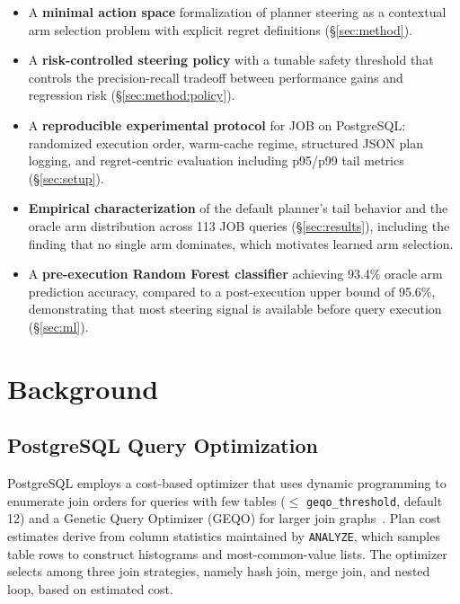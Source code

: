 \documentclass[sigconf,natbib=false]{article}
\newcommand{\postgres}{PostgreSQL}
\begin{document}
\begin{itemize}[noitemsep,topsep=2pt,leftmargin=*]
  \item A \textbf{minimal action space} formalization of planner steering as a contextual
        arm selection problem with explicit regret definitions (\S\ref{sec:method}).

  \item A \textbf{risk-controlled steering policy} with a tunable safety threshold that
        controls the precision-recall tradeoff between performance gains and regression risk
        (\S\ref{sec:method:policy}).

  \item A \textbf{reproducible experimental protocol} for JOB on \postgres{}: randomized
        execution order, warm-cache regime, structured JSON plan logging, and regret-centric
        evaluation including p95/p99 tail metrics (\S\ref{sec:setup}).

  \item \textbf{Empirical characterization} of the default planner's tail behavior and the
        oracle arm distribution across 113 JOB queries (\S\ref{sec:results}), including the
        finding that no single arm dominates, which motivates learned arm selection.

  \item A \textbf{pre-execution Random Forest classifier} achieving 93.4\% oracle arm
        prediction accuracy, compared to a post-execution upper bound of 95.6\%, demonstrating
        that most steering signal is available before query execution (\S\ref{sec:ml}).
\end{itemize}

\section{Background}
\label{sec:background}

\subsection{PostgreSQL Query Optimization}

\postgres{} employs a cost-based optimizer that uses dynamic programming to enumerate join
orders for queries with few tables ($\leq$ \texttt{geqo\_threshold}, default 12) and a
Genetic Query Optimizer (GEQO) for larger join graphs~\cite{PGDocs}. Plan cost estimates
derive from column statistics maintained by \texttt{ANALYZE}, which samples table rows to
construct histograms and most-common-value lists. The optimizer selects among three join
strategies, namely hash join, merge join, and nested loop, based on estimated cost.
\end{document}
